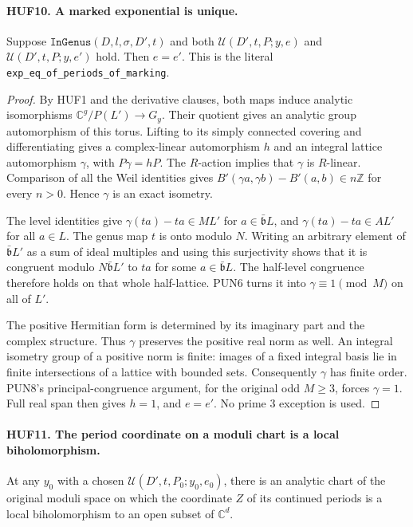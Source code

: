 \paragraph{HUF10. A marked exponential is unique.}
\label{claim:HUF10}
Suppose \(\texttt{InGenus}(D,l,\sigma,D',t)\) and
both \(\mathcal U(D',t,P;y,e)\) and
\(\mathcal U(D',t,P;y,e')\) hold.  Then \(e=e'\).
This is the literal \texttt{exp\_eq\_of\_periods\_of\_marking}.

\begin{proof}
By HUF1 and the derivative clauses, both maps induce
analytic isomorphisms \(\mathbb C^g/P(L')\to G_y\).
Their quotient gives an analytic group automorphism
of this torus.  Lifting to its simply connected
covering and differentiating gives a complex-linear
automorphism \(h\) and an integral lattice
automorphism \(\gamma\), with \(P\gamma=hP\).
The \(R\)-action implies that \(\gamma\) is \(R\)-linear.
Comparison of all the Weil identities gives
\(B'(\gamma a,\gamma b)-B'(a,b)\in n\mathbb Z\)
for every \(n>0\).  Hence \(\gamma\) is an exact
isometry.

The level identities give
\(\gamma(ta)-ta\in ML'\) for
\(a\in\bar{\mathfrak b}L\), and
\(\gamma(ta)-ta\in AL'\) for all \(a\in L\).
The genus map \(t\) is onto modulo \(N\).
Writing an arbitrary element of
\(\bar{\mathfrak b}L'\) as a sum of ideal multiples
and using this surjectivity shows that it is congruent
modulo \(N\bar{\mathfrak b}L'\) to \(ta\) for
some \(a\in\bar{\mathfrak b}L\).  The half-level
congruence therefore holds on that whole half-lattice.
PUN6 turns it into \(\gamma\equiv1\pmod M\)
on all of \(L'\).

The positive Hermitian form is determined by its
imaginary part and the complex structure.  Thus
\(\gamma\) preserves the positive real norm as well.
An integral isometry group of a positive norm is
finite: images of a fixed integral basis lie in
finite intersections of a lattice with bounded
sets.  Consequently \(\gamma\) has finite order.
PUN8's principal-congruence argument, for the
original odd \(M\geq3\), forces \(\gamma=1\).
Full real span then gives \(h=1\), and \(e=e'\).
No prime \(3\) exception is used.
\end{proof}

\paragraph{HUF11. The period coordinate on a moduli chart is a local biholomorphism.}
\label{claim:HUF11}
At any \(y_0\) with a chosen \(\mathcal U(D',t,P_0;y_0,e_0)\),
there is an analytic chart of the original moduli space
on which the coordinate \(Z\) of its continued periods
is a local biholomorphism to an open subset of
\(\mathbb C^d\).

